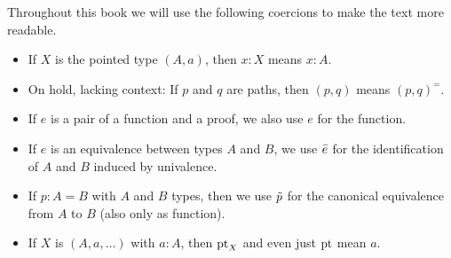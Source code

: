 Throughout this book we will use the following coercions to make the text more readable.
\begin{itemize}[noitemsep]
\item If $X$ is the pointed type $(A,a)$, then $x:X$ means $x:A$.
\item On hold, lacking context: If $p$ and $q$ are paths, then $(p,q)$ means $(p,q)^=$.
\item If $e$ is a pair of a function and a proof, we also use $e$ for the function.
\item If $e$ is an equivalence between types $A$ and $B$, we use $\bar e$ for the
identification of $A$ and $B$ induced by univalence.
\item If $p: A= B$ with $A$ and $B$ types, then we use $\tilde p$ for the canonical
equivalence from $A$ to $B$ (also only as function).
\item If $X$ is $(A,a,\ldots)$ with $a:A$, then ${\mathord{\mathrm{pt}}}_X$ and even just ${\mathord{\mathrm{pt}}}$ mean $a$. 
\end{itemize}


